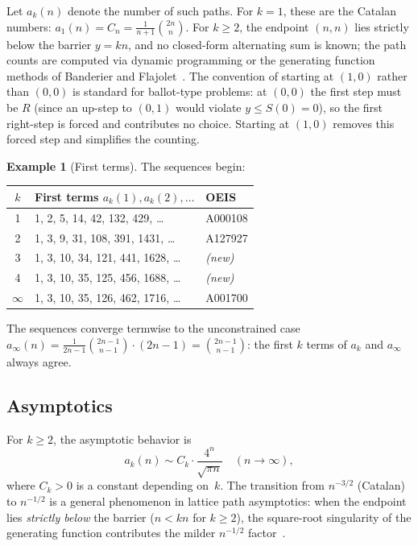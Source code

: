 \documentclass[11pt]{article}
\theoremstyle{definition}
\newtheorem{example}[theorem]{Example}
\theoremstyle{remark}
\begin{document}
Let $a_k(n)$ denote the number of such paths.
For $k = 1$, these are the Catalan numbers:
$a_1(n) = C_n = \frac{1}{n+1}\binom{2n}{n}$.
For $k \geq 2$, the endpoint $(n, n)$ lies strictly below the barrier
$y = kn$, and no closed-form alternating sum is known; the path counts
are computed via dynamic programming or the generating function methods
of Banderier and Flajolet~\cite{BanderierFlajolet2002}.
The convention of starting at $(1, 0)$ rather than $(0, 0)$ is standard
for ballot-type problems: at $(0, 0)$ the first step must be $R$ (since
an up-step to $(0, 1)$ would violate $y \leq S(0) = 0$), so the first
right-step is forced and contributes no choice.
Starting at $(1, 0)$ removes this forced step and simplifies the
counting.

\begin{example}[First terms]\label{ex:first-terms}
The sequences begin:
\begin{center}
\begin{tabular}{cll}
\toprule
$k$ & First terms $a_k(1), a_k(2), \ldots$ & OEIS \\
\midrule
1 & 1, 2, 5, 14, 42, 132, 429, \ldots & A000108 \\
2 & 1, 3, 9, 31, 108, 391, 1431, \ldots & A127927 \\
3 & 1, 3, 10, 34, 121, 441, 1628, \ldots & \emph{(new)} \\
4 & 1, 3, 10, 35, 125, 456, 1688, \ldots & \emph{(new)} \\
$\infty$ & 1, 3, 10, 35, 126, 462, 1716, \ldots & A001700 \\
\bottomrule
\end{tabular}
\end{center}
The sequences converge termwise to the unconstrained case $a_\infty(n) =
\frac{1}{2n-1}\binom{2n-1}{n-1} \cdot (2n-1) = \binom{2n-1}{n-1}$: the
first $k$ terms of $a_k$ and $a_\infty$ always agree.
\end{example}

\subsection{Asymptotics}

For $k \geq 2$, the asymptotic behavior is
\begin{equation}\label{eq:asymp-lattice}
a_k(n) \sim C_k \cdot \frac{4^n}{\sqrt{\pi n}} \quad (n \to \infty),
\end{equation}
where $C_k > 0$ is a constant depending on~$k$.
The transition from $n^{-3/2}$ (Catalan) to $n^{-1/2}$ is a general
phenomenon in lattice path asymptotics: when the endpoint lies
\emph{strictly below} the barrier ($n < kn$ for $k \geq 2$), the
square-root singularity of the generating function contributes the
milder $n^{-1/2}$ factor~\cite{FlajoletSedgewick2009, BanderierFlajolet2002}.
\end{document}
